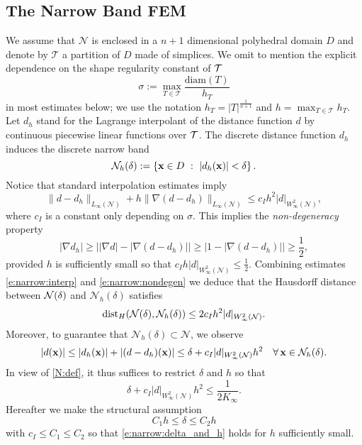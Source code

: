 \subsection{The Narrow Band FEM}\label{S:FE-narrow-band}

We assume that $\mathcal{N}$ is enclosed in a $n+1$ dimensional polyhedral domain $D$ and denote by $\mathcal T$ a partition of $D$ made of simplices. We omit to mention the explicit dependence on the shape regularity constant of $\mathcal{T}$
$$
\sigma := \max_{T\in \mathcal T} \frac{\textrm{diam}(T)}{h_T}
$$
in most estimates below;
we use the notation $h_T=| T |^{\frac 1 {n+1}}$ and $h=\max_{T\in \mathcal T} h_T$.
Let $d_h$ stand for the Lagrange interpolant of the
distance function $d$ by continuous piecewise linear functions over $\mathcal{T}$. The discrete distance function $d_h$ induces the discrete narrow band
$$
\mathcal N_h(\delta) := \left\lbrace {\bf x} \in D \ : \  |d_h({\bf x})| < \delta \right\rbrace.
$$ 
%
Notice that standard interpolation estimates imply
\begin{equation}\label{e:narrow:interp}
  \| d - d_h \|_{L_\infty(\mathcal N)} + h \| \nabla (d-d_h)\|_{L_\infty(\mathcal N)} \leq c_I h^2
  | d |_{W^2_\infty(\mathcal N)},
\end{equation}
where $c_I$ is a constant only depending on $\sigma$.
This implies the {\it non-degeneracy} property
%
\begin{equation}\label{e:narrow:nondegen}
| \nabla d_h| \geq \big| |\nabla d| - |\nabla(d-d_h)| \big| \geq  \big| 1 - |\nabla(d-d_h)| \big|  \geq  \frac 1 2,
\end{equation}
provided $h$ is sufficiently small so that
$
c_I h | d |_{W^2_\infty(\mathcal N)} \leq \frac 1 2. 
$
Combining estimates \eqref{e:narrow:interp} and \eqref{e:narrow:nondegen}
we deduce that the Hausdorff distance between
${\mathcal{N}(\delta)}$ and $\mathcal{N}_h(\delta)$ satisfies 
%
\begin{equation}\label{hausdorff}
\operatorname{dist}_H({\mathcal{N}(\delta)},\mathcal{N}_h(\delta)) \le 2 c_I h^2 | d |_{W^2_\infty(\mathcal N)}.
\end{equation}
Moreover, to guarantee that $\mathcal N_h(\delta) \subset \mathcal N$, we observe
$$
|d({\bf x})| \leq |d_h({\bf x})| + |(d-d_h)({\bf x})| \leq \delta + c_I | d |_{W^2_\infty(\mathcal N)} h^2
\quad\forall \, {\bf x} \in \mathcal N_h(\delta).
$$
In view of \eqref{N:def}, it thus suffices to restrict $\delta$ and $h$ so that
%
\begin{equation}\label{e:narrow:delta_and_h}
\delta + c_I | d |_{W^2_\infty(\mathcal N)} h^2 \leq \frac{1}{2K_\infty}.
\end{equation}
%
Hereafter we make the structural assumption
%
\begin{equation}\label{delta-h}
C_1 h \le \delta \le C_2 h
\end{equation}
%
with $c_I \le C_1 \le C_2$ so that \eqref{e:narrow:delta_and_h} holds for $h$ sufficiently small.

